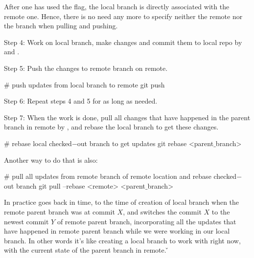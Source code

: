 After one has used the  flag, the local branch is directly associated with the remote one. Hence, there is
no need any more to specify neither the remote nor the branch when pulling and pushing.
\item Step 4: Work on local branch, make changes and commit them to local repo by  and .
\item Step 5: Push the changes to remote branch on remote.

\begin{bash}
# push updates from local branch to remote
git push
\end{bash}

\item Step 6: Repeat steps 4 and 5 for as long as needed.
\item Step 7: When the work is done, pull all changes that have happened in the parent branch in remote by , and rebase the local branch to get these changes.

\begin{bash}
# rebase local checked$-$out branch to get updates
git rebase <parent$\_$branch>
\end{bash}

Another way to do that is also:

\begin{bash}
# pull all updates from remote branch of remote location and rebase checked$-$out branch
git pull --rebase <remote> <parent$\_$branch>
\end{bash}

In practice  goes back in time, to the time of creation of local branch when the remote parent
branch was at commit $X$, and switches the commit $X$ to the newest commit $Y$ of remote parent branch, incorporating
all the updates that have happened in remote parent branch while we were working in our local branch. In other words
it's like creating a local branch to work with right now, with the current state of the parent branch in remote. \v

